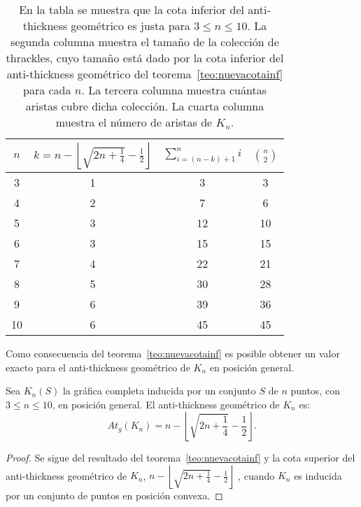     \begin{table}[t]
      \centering
      \begin{tabular}{|c|c|c|c|}
        \hline
        $n$ & $k=n - \left\lfloor\sqrt{2n+\frac{1}{4}} - \frac{1}{2}\right\rfloor$ & $\sum^n_{i=(n-k) + 1}i$ & $\binom{n}{2}$\\[5pt] \hline\hline
        3   & 1  & 3 & 3 \\ \hline
        4   & 2  & 7 & 6 \\ \hline
        5   & 3  & 12 & 10 \\ \hline
        6   & 3  & 15 & 15 \\ \hline
        7   & 4  & 22 & 21 \\ \hline
        8   & 5  & 30 & 28 \\ \hline
        9   & 6  & 39 & 36 \\ \hline
        10  & 6  & 45 & 45 \\ \hline
      \end{tabular}
      \caption{En la tabla se muestra que la cota inferior del anti-thickness
      geométrico es justa para $3 \leq n \leq 10$. La segunda columna muestra el
      tamaño de la colección de thrackles, cuyo tamaño está dado por la cota
      inferior del anti-thickness geométrico del teorema~\ref{teo:nuevacotainf}
      para cada $n$. La tercera columna muestra cuántas aristas cubre dicha
      colección. La cuarta columna muestra el número de aristas de $K_n$.}
      \label{table:atnuevacota}
    \end{table}

    Como consecuencia del teorema~\ref{teo:nuevacotainf} es posible obtener un valor exacto para el anti-thickness geométrico de $K_n$ en posición general.
    \begin{theorem}\label{teo:cotaexacta}
      Sea $K_n(S)$ la gráfica completa inducida por un conjunto $S$ de $n$ puntos, con $3 \leq n \leq 10$, en posición general. El anti-thickness geométrico de $K_n$ es:
      \[ At_g(K_n) = n - \left\lfloor\sqrt{2n + \frac{1}{4}} - \frac{1}{2}\right\rfloor. \]
    \end{theorem}
    \begin{proof}
      Se sigue del resultado del teorema~\ref{teo:nuevacotainf} y
      la cota superior del anti-thickness geométrico de $K_n$,
      $n - \left\lfloor\sqrt{2n + \frac{1}{4}} - \frac{1}{2}\right\rfloor $ , cuando
      $K_n$ es inducida por un conjunto de puntos en posición convexa.
    \end{proof}

